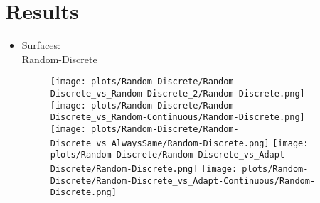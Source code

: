 \documentclass{article}
\begin{document}
\section{Results}
\begin{itemize}

\def \w {0.20}
\def \a {45}

\newpage
\item Surfaces:\\


Random-Discrete\\
\begin{figure}[!h]
	\centering
	\begin{minipage}[c]{0.1\textwidth}
		\raggedleft
	\end{minipage}
	\begin{minipage}[c]{0.80\textwidth}
		\hfill
		\hfill
		\hfill
		\hfill
		\hfill
	\end{minipage}
\end{figure}
\begin{figure}[!h]
	\centering
	\begin{minipage}[c]{0.1\textwidth}
		\raggedleft
	\end{minipage}
	\begin{minipage}[c]{0.80\textwidth}
		\texttt{[image: plots/Random-Discrete/Random-Discrete\_vs\_Random-Discrete\_2/Random-Discrete.png]}\hfill
		\texttt{[image: plots/Random-Discrete/Random-Discrete\_vs\_Random-Continuous/Random-Discrete.png]}\hfill
		\texttt{[image: plots/Random-Discrete/Random-Discrete\_vs\_AlwaysSame/Random-Discrete.png]}\hfill
		\texttt{[image: plots/Random-Discrete/Random-Discrete\_vs\_Adapt-Discrete/Random-Discrete.png]}\hfill
		\texttt{[image: plots/Random-Discrete/Random-Discrete\_vs\_Adapt-Continuous/Random-Discrete.png]}\hfill
	\end{minipage}
\end{figure}
\begin{figure}[!h]

\end{figure}
\end{itemize}
\end{document}
